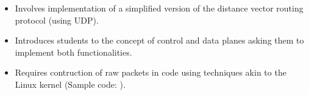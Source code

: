 {\begin{itemize}
        \begin{itemize}
          \item Involves implementation of a simplified version of the distance vector routing protocol (using UDP).
          \item Introduces students to the concept of control and data planes asking them to implement both functionalities.
          \item Requires contruction of raw packets in code using techniques akin to the Linux kernel (Sample code: ).
        \end{itemize}
\end{itemize}
}
